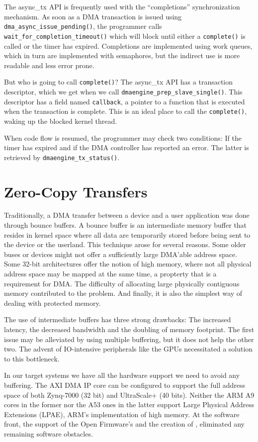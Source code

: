 The async\_tx API is frequently used with the ``completions'' synchronization mechanism.
As soon as a DMA transaction is issued using \texttt{dma\_async\_issue\_pending()},
the programmer calls \texttt{wait\_for\_completion\_timeout()} which will block
until either a \texttt{complete()} is called or the timer has expired.
Completions are implemented using work queues, which in turn are implemented with semaphores,
but the indirect use is more readable and less error prone.

But who is going to call \texttt{complete()}? The async\_tx API has a transaction descriptor, 
which we get when we call \texttt{dmaengine\_prep\_slave\_single()}.
This descriptor has a field named \texttt{callback}, a pointer to a function
that is executed when the transaction is complete. This is an ideal place
to call the \texttt{complete()}, waking up the blocked kernel thread.

When code flow is resumed, the programmer may check two conditions:
If the timer has expired and if the DMA controller has reported an error.
The latter is retrieved by \texttt{dmaengine\_tx\_status()}.

\section{Zero-Copy Transfers}

Traditionally, a DMA transfer between a device and a user application was done through bounce buffers.
A bounce buffer is an intermediate memory buffer that resides in kernel space where all data are
temporarily stored before being sent to the device or the userland.  This technique arose for
several reasons. Some older buses or devices might not offer a sufficiently large DMA'able address space.
Some 32-bit architectures offer the notion of high memory, where not all physical address space may be
mapped at the same time, a propterty that is a requirement for DMA. The difficulty of allocating
large physically contiguous memory contributed to the problem. And finally, it is also the simplest way
of dealing with protected memory.

The use of intermediate buffers has three strong drawbacks: The increased latency, the decreased
bandwidth and the doubling of memory footprint. The first issue may be alleviated by using
multiple buffering, but it does not help the other two. The advent of IO-intensive peripherals like
the GPUs necessitated a solution to this bottleneck.

In our target systems we have all the hardware support we need to avoid any buffering.
The AXI DMA IP core can be configured to support the full address space of both Zynq-7000 (32 bit)
and UltraScale+ (40 bits). Neither the ARM A9 cores in the former nor the A53 ones in the latter
support Large Physical Address Extensions (LPAE), ARM's implementation of high memory. 
At the software front, the support of the Open Firmware's  
and the creation of , eliminated any remaining software obstacles.

